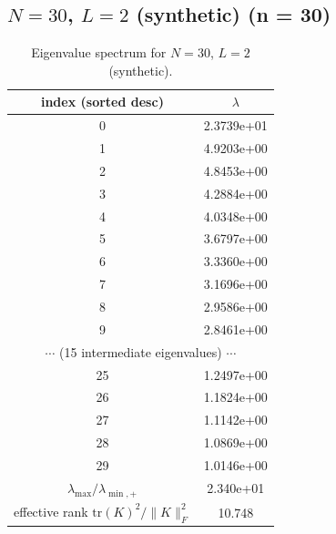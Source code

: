 \subsection*{$N=30$, $L=2$ (synthetic) \quad (n = 30)}
\begin{table}[H]
\centering
\caption{Eigenvalue spectrum for $N=30$, $L=2$ (synthetic).}
\begin{tabular}{c c}
\toprule
index (sorted desc) & $\lambda$ \\
\midrule
0 & 2.3739e+01 \\
1 & 4.9203e+00 \\
2 & 4.8453e+00 \\
3 & 4.2884e+00 \\
4 & 4.0348e+00 \\
5 & 3.6797e+00 \\
6 & 3.3360e+00 \\
7 & 3.1696e+00 \\
8 & 2.9586e+00 \\
9 & 2.8461e+00 \\
\multicolumn{2}{c}{$\cdots$ (15 intermediate eigenvalues) $\cdots$} \\
25 & 1.2497e+00 \\
26 & 1.1824e+00 \\
27 & 1.1142e+00 \\
28 & 1.0869e+00 \\
29 & 1.0146e+00 \\
\midrule
$\lambda_{\max}/\lambda_{\min, +}$ & 2.340e+01 \\
effective rank $\mathrm{tr}(K)^2/\|K\|_F^2$ & 10.748 \\
\bottomrule
\end{tabular}
\end{table}

